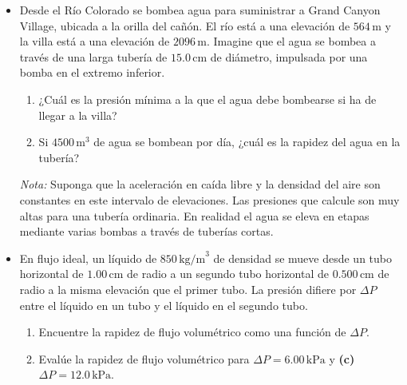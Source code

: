 \documentclass[11pt,a4paper]{article}
\begin{document}
\newpage

\begin{itemize}
    \item[\textbf{23.}] Desde el Río Colorado se bombea agua para suministrar a Grand Canyon Village, ubicada a la orilla del cañón. El río está a una elevación de \(564\,\text{m}\) y la villa está a una elevación de \(2096\,\text{m}\). Imagine que el agua se bombea a través de una larga tubería de \(15.0\,\text{cm}\) de diámetro, impulsada por una bomba en el extremo inferior.
    \begin{enumerate}
        \item ¿Cuál es la presión mínima a la que el agua debe bombearse si ha de llegar a la villa?
        \item Si \(4500\,\text{m}^3\) de agua se bombean por día, ¿cuál es la rapidez del agua en la tubería?
    \end{enumerate}
    \textit{Nota:} Suponga que la aceleración en caída libre y la densidad del aire son constantes en este intervalo de elevaciones. Las presiones que calcule son muy altas para una tubería ordinaria. En realidad el agua se eleva en etapas mediante varias bombas a través de tuberías cortas.
    \vspace*{7cm}
    
    \item[\textbf{24.}] En flujo ideal, un líquido de \(850\,\text{kg/m}^3\) de densidad se mueve desde un tubo horizontal de \(1.00\,\text{cm}\) de radio a un segundo tubo horizontal de \(0.500\,\text{cm}\) de radio a la misma elevación que el primer tubo. La presión difiere por \(\Delta P\) entre el líquido en un tubo y el líquido en el segundo tubo.
    \begin{enumerate}
        \item Encuentre la rapidez de flujo volumétrico como una función de \(\Delta P\).
        \item Evalúe la rapidez de flujo volumétrico para \(\Delta P = 6.00\,\text{kPa}\) y \textbf{(c)} \(\Delta P = 12.0\,\text{kPa}\).
    \end{enumerate}
    \vspace*{7cm}
    

\end{itemize}
\end{document}
